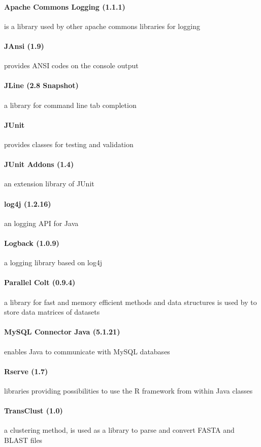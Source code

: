	\paragraph{Apache Commons Logging (1.1.1)} is a library used by other apache commons libraries for logging
	\paragraph{JAnsi (1.9)} provides ANSI codes on the console output
	\paragraph{JLine (2.8 Snapshot)} a library for command line tab completion
	\paragraph{JUnit} provides classes for testing and validation
	\paragraph{JUnit Addons (1.4)} an extension library of JUnit
	\paragraph{log4j (1.2.16)} an logging API for Java
	\paragraph{Logback (1.0.9)} a logging library based on log4j
	\paragraph{Parallel Colt (0.9.4)} a library for fast and memory efficient methods and data structures is used by \clusteval to store data matrices of datasets
	\paragraph{MySQL Connector Java (5.1.21)} enables Java to communicate with MySQL databases
	\paragraph{Rserve (1.7)} libraries providing possibilities to use the R framework from within Java classes
	\paragraph{TransClust (1.0)} a clustering method, is used as a library to parse and convert FASTA and BLAST files

